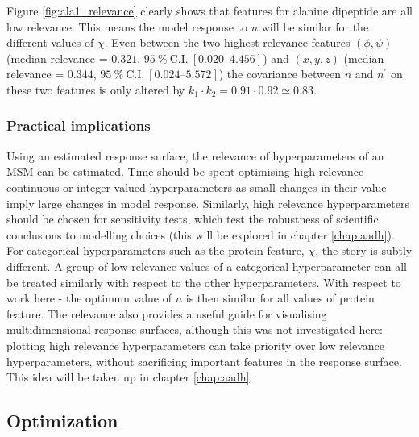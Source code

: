Figure \ref{fig:ala1_relevance} clearly shows that features for alanine dipeptide are all low relevance. This means the model response to $n$ will be similar for the different values of $\chi$. Even between  the two highest relevance features $(\phi, \psi)$ (median relevance = $0.321$, $\SI{95}{\percent}\ \mathrm{C.I.}\ [\numrange[range-phrase=\text{--}]{0.020}{4.456}]$) and $(x,y,z)$ (median relevance = $0.344$, $\SI{95}{\percent}\ \mathrm{C.I.}\ [\numrange[range-phrase=\text{--}]{0.024}{5.572}]$) the covariance between $n$ and $n^{\prime}$ on these two features is only altered by  $k_{1}\cdot k_{2} = 0.91\cdot0.92 \simeq 0.83$. 

\subsubsection{Practical implications}

Using an estimated response surface, the relevance of hyperparameters of an MSM can be estimated. Time should be spent optimising high relevance continuous or integer-valued hyperparameters as small changes in their value imply large changes in model response. Similarly, high relevance hyperparameters should be chosen for sensitivity tests, which test the robustness of scientific conclusions to modelling choices (this will be explored in chapter \ref{chap:aadh}).  
For  categorical hyperparameters such as the protein feature, $\chi$, the story is subtly different.  A group of low relevance values of a categorical hyperparameter can all be treated similarly with respect to the other hyperparameters. With respect to work here - the optimum value of $n$ is then similar for all values of protein feature. The relevance also provides a useful guide for visualising multidimensional response surfaces, although this was not investigated here: plotting high relevance hyperparameters can take priority over low relevance hyperparameters, without sacrificing important features in the response surface. This idea will be taken up in chapter \ref{chap:aadh}.  

\subsection{Optimization}\label{sec:ala_opt}

